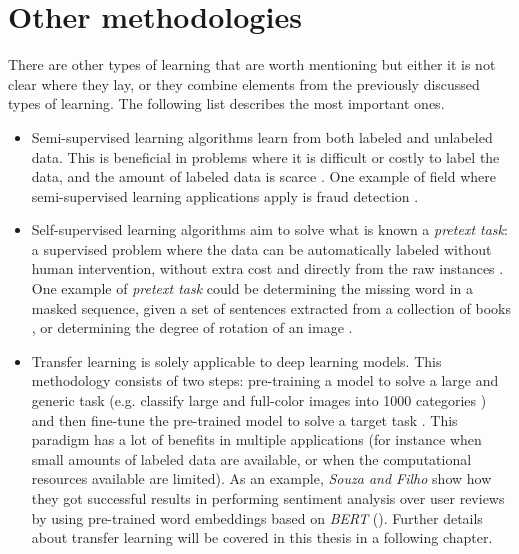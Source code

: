 \section{Other methodologies}
There are other types of learning \cite{raghu2020} that are worth mentioning but either it is not clear where they lay, or they combine elements from the previously discussed types of learning. The following list describes the most important ones.
\begin{itemize}
	\item Semi-supervised learning algorithms learn from both labeled and unlabeled data. This is beneficial in problems where it is difficult or costly to label the data, and the amount of labeled data is scarce \cite{raghu2020}. One example of field where semi-supervised learning applications apply is fraud detection \cite{wang2020}.
	\item Self-supervised learning algorithms aim to solve what is known a \textit{pretext task}: a supervised problem where the data can be automatically labeled without human intervention, without extra cost and directly from the raw instances \cite{raghu2020}. One example of \textit{pretext task} could be determining the missing word in a masked sequence, given a set of sentences extracted from a collection of books \cite{devlin2019}, or determining the degree of rotation of an image \cite{gidaris2018}.
	\item Transfer learning is solely applicable to deep learning models. This methodology consists of two steps: pre-training a model to solve a large and generic task (e.g. classify large and full-color images into 1000 categories \cite{deng2009imagenet}) and then fine-tune the pre-trained model to solve a target task \cite{raghu2020}. This paradigm has a lot of benefits in multiple applications (for instance when small amounts of labeled data are available, or when the computational resources available are limited). As an example, \textit{Souza and Filho} \cite{souza2022} show how they got successful results in performing sentiment analysis over user reviews by using pre-trained word embeddings based on \textit{BERT} (\cite{devlin2019}). Further details about transfer learning will be covered in this thesis in a following chapter.
\end{itemize}